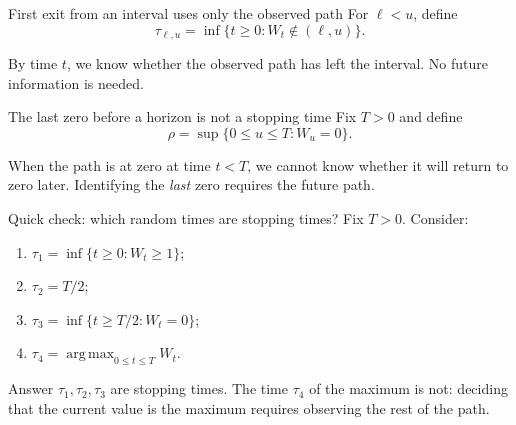 \documentclass[handout,10pt,aspectratio=169]{beamer}
\begin{document}
\begin{frame}{First exit from an interval uses only the observed path}
For \(\ell<u\), define
\[
\tau_{\ell,u}=\inf\{t\ge0:W_t\notin(\ell,u)\}.
\]
\begin{center}
\end{center}
By time \(t\), we know whether the observed path has left the interval. No future information is needed.
\end{frame}

\begin{frame}{The last zero before a horizon is not a stopping time}
Fix \(T>0\) and define
\[
\rho=\sup\{0\le u\le T:W_u=0\}.
\]
\begin{center}
\end{center}
When the path is at zero at time \(t<T\), we cannot know whether it will return to zero later. Identifying the \emph{last} zero requires the future path.
\end{frame}

\begin{frame}{Quick check: which random times are stopping times?}
Fix \(T>0\). Consider:
\begin{enumerate}\setlength{\itemsep}{0.55em}
  \item \(\tau_1=\inf\{t\ge0:W_t\ge1\}\);
  \item \(\tau_2=T/2\);
  \item \(\tau_3=\inf\{t\ge T/2:W_t=0\}\);
  \item \(\tau_4=\operatorname*{arg\,max}_{0\le t\le T}W_t\).
\end{enumerate}

\begin{block}{Answer}
\(\tau_1,\tau_2,\tau_3\) are stopping times. The time \(\tau_4\) of the maximum is not: deciding that the current value is the maximum requires observing the rest of the path.
\end{block}
\end{frame}
\end{document}
